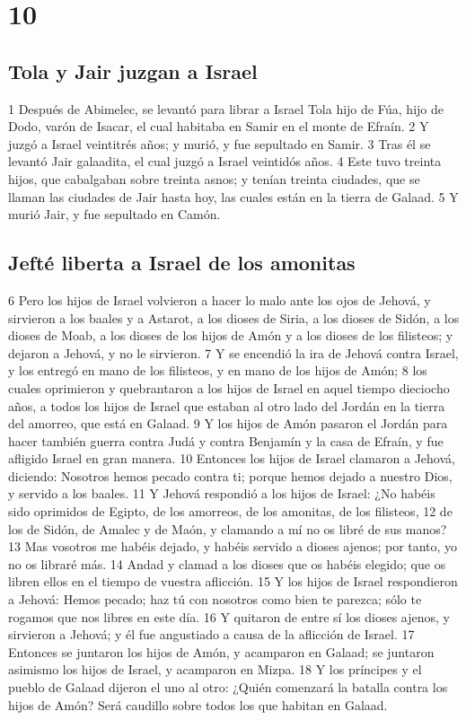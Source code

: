 \chapter{10}

\section*{Tola y Jair juzgan a Israel}


1 Después de Abimelec, se levantó para librar a Israel Tola hijo de Fúa, hijo de Dodo, varón de Isacar, el cual habitaba en Samir en el monte de Efraín. 
2 Y juzgó a Israel veintitrés años; y murió, y fue sepultado en Samir.
3 Tras él se levantó Jair galaadita, el cual juzgó a Israel veintidós años.
4 Este tuvo treinta hijos, que cabalgaban sobre treinta asnos; y tenían treinta ciudades, que se llaman las ciudades de Jair hasta hoy, las cuales están en la tierra de Galaad.
5 Y murió Jair, y fue sepultado en Camón.
\section*{Jefté liberta a Israel de los amonitas}

6 Pero los hijos de Israel volvieron a hacer lo malo ante los ojos de Jehová, y sirvieron a los baales y a Astarot, a los dioses de Siria, a los dioses de Sidón, a los dioses de Moab, a los dioses de los hijos de Amón y a los dioses de los filisteos; y dejaron a Jehová, y no le sirvieron.
7 Y se encendió la ira de Jehová contra Israel, y los entregó en mano de los filisteos, y en mano de los hijos de Amón;
8 los cuales oprimieron y quebrantaron a los hijos de Israel en aquel tiempo dieciocho años, a todos los hijos de Israel que estaban al otro lado del Jordán en la tierra del amorreo, que está en Galaad.
9 Y los hijos de Amón pasaron el Jordán para hacer también guerra contra Judá y contra Benjamín y la casa de Efraín, y fue afligido Israel en gran manera.
10 Entonces los hijos de Israel clamaron a Jehová, diciendo: Nosotros hemos pecado contra ti; porque hemos dejado a nuestro Dios, y servido a los baales.
11 Y Jehová respondió a los hijos de Israel: ¿No habéis sido oprimidos de Egipto, de los amorreos, de los amonitas, de los filisteos,
12 de los de Sidón, de Amalec y de Maón, y clamando a mí no os libré de sus manos?
13 Mas vosotros me habéis dejado, y habéis servido a dioses ajenos; por tanto, yo no os libraré más.
14 Andad y clamad a los dioses que os habéis elegido; que os libren ellos en el tiempo de vuestra aflicción.
15 Y los hijos de Israel respondieron a Jehová: Hemos pecado; haz tú con nosotros como bien te parezca; sólo te rogamos que nos libres en este día.
16 Y quitaron de entre sí los dioses ajenos, y sirvieron a Jehová; y él fue angustiado a causa de la aflicción de Israel.
17 Entonces se juntaron los hijos de Amón, y acamparon en Galaad; se juntaron asimismo los hijos de Israel, y acamparon en Mizpa.
18 Y los príncipes y el pueblo de Galaad dijeron el uno al otro: ¿Quién comenzará la batalla contra los hijos de Amón? Será caudillo sobre todos los que habitan en Galaad.

